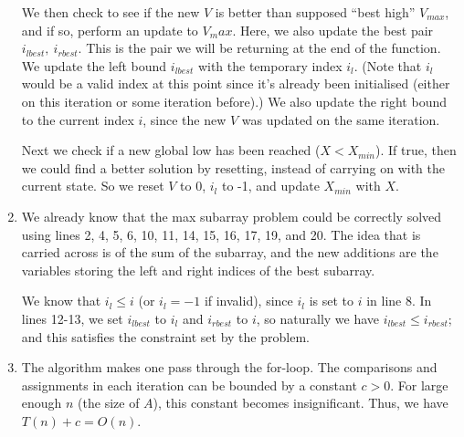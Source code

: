 \documentclass[12pt,a4paper]{article}
\begin{document}
\begin{enumerate}[label=(\alph*)]
			We then check to see if the new $V$ is better than supposed ``best high'' $V_{max}$, and if so, perform an update to $V_max$. Here, we also update the best pair $i_{lbest},\ i_{rbest}$. This is the pair we will be returning at the end of the function. We update the left bound $i_{lbest}$ with the temporary index $i_l$. (Note that $i_l$ would be a valid index at this point since it's already been initialised (either on this iteration or some iteration before).) We also update the right bound to the current index $i$, since the new $V$ was updated on the same iteration.

			Next we check if a new global low has been reached ($X < X_{min}$). If true, then we could find a better solution by resetting, instead of carrying on with the current state. So we reset $V$ to 0, $i_l$ to -1, and update $X_{min}$ with $X$.

			\item
			We already know that the max subarray problem could be correctly solved using lines 2, 4, 5, 6, 10, 11, 14, 15, 16, 17, 19, and 20. The idea that is carried across is of the sum of the subarray, and the new additions are the variables storing the left and right indices of the best subarray.

			We know that $i_l \le i$ (or $i_l = -1$ if invalid), since $i_l$ is set to $i$ in line 8. In lines 12-13, we set $i_{lbest}$ to $i_l$ and $i_{rbest}$ to $i$, so naturally we have $i_{lbest} \le i_{rbest}$; and this satisfies the constraint set by the problem.

			\item
			The algorithm makes one pass through the for-loop. The comparisons and assignments in each iteration can be bounded by a constant $c > 0$. For large enough $n$ (the size of $A$), this constant becomes insignificant. Thus, we have $T(n) + c = O(n)$.
		\end{enumerate}

	\newpage
\end{document}
